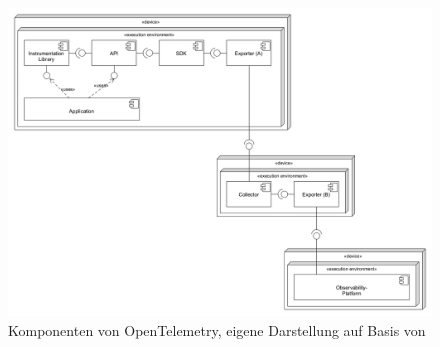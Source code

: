 \begin{figure}[H]
	\centering
	\includegraphics[width=1.00\linewidth]{img/03_methoden/otel_components.png}
	\caption{Komponenten von OpenTelemetry, eigene Darstellung auf Basis von \cite{OTelSpecification}}
	\label{fig:otel-components}
\end{figure}